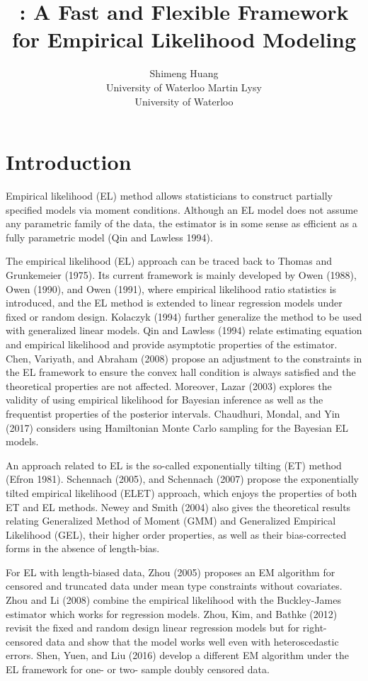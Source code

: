 \documentclass[article]{jss}
\author{
Shimeng Huang\\University of Waterloo \And Martin Lysy\\University of Waterloo
}
\title{\pkg{flexEL}: A Fast and Flexible Framework for Empirical Likelihood Modeling}
\renewcommand{\|}{\,|\,}
\begin{document}
\maketitle

%
\hypertarget{introduction}{%
\section{Introduction}\label{introduction}}

Empirical likelihood (EL) method allows statisticians to construct partially specified models via moment conditions. Although an EL model does not assume any parametric family of the data, the estimator is in some sense as efficient as a fully parametric model (Qin and Lawless 1994).

The empirical likelihood (EL) approach can be traced back to Thomas and Grunkemeier (1975). Its current framework is mainly developed by Owen (1988), Owen (1990), and Owen (1991), where empirical likelihood ratio statistics is introduced, and the EL method is extended to linear regression models under fixed or random design. Kolaczyk (1994) further generalize the method to be used with generalized linear models. Qin and Lawless (1994) relate estimating equation and empirical likelihood and provide asymptotic properties of the estimator. Chen, Variyath, and Abraham (2008) propose an adjustment to the constraints in the EL framework to ensure the convex hall condition is always satisfied and the theoretical properties are not affected. Moreover, Lazar (2003) explores the validity of using empirical likelihood for Bayesian inference as well as the frequentist properties of the posterior intervals. Chaudhuri, Mondal, and Yin (2017) considers using Hamiltonian Monte Carlo sampling for the Bayesian EL models.

An approach related to EL is the so-called exponentially tilting (ET) method (Efron 1981). Schennach (2005), and Schennach (2007) propose the exponentially tilted empirical likelihood (ELET) approach, which enjoys the properties of both ET and EL methods. Newey and Smith (2004) also gives the theoretical results relating Generalized Method of Moment (GMM) and Generalized Empirical Likelihood (GEL), their higher order properties, as well as their bias-corrected forms in the absence of length-bias.

For EL with length-biased data, Zhou (2005) proposes an EM algorithm for censored and truncated data under mean type constraints without covariates. Zhou and Li (2008) combine the empirical likelihood with the Buckley-James estimator which works for regression models. Zhou, Kim, and Bathke (2012) revisit the fixed and random design linear regression models but for right-censored data and show that the model works well even with heteroscedastic errors. Shen, Yuen, and Liu (2016) develop a different EM algorithm under the EL framework for one- or two- sample doubly censored data.
\end{document}
